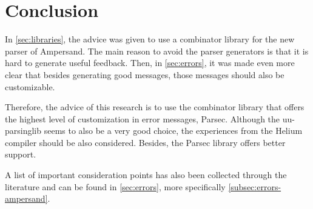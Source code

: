 
\section{Conclusion}
\label{sec:conclusion}
In \autoref{sec:libraries}, the advice was given to use a combinator library for the new parser of Ampersand.
The main reason to avoid the parser generators is that it is hard to generate useful feedback.
Then, in \autoref{sec:errors}, it was made even more clear that besides generating good messages, those messages should also be customizable.

Therefore, the advice of this research is to use the combinator library that offers the highest level of customization in error messages, Parsec.
Although the uu-parsinglib seems to also be a very good choice, the experiences from the Helium compiler  should be also considered.
Besides, the Parsec library offers better support.

A list of important consideration points has also been collected through the literature and can be found in \autoref{sec:errors}, more specifically \ref{subsec:errors-ampersand}.